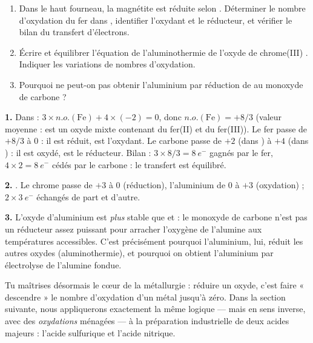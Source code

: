 \documentclass[11pt]{article}
\begin{document}
\begin{exercice}
\begin{enumerate}
\item Dans le haut fourneau, la magnétite est réduite selon . Déterminer le nombre d'oxydation du fer dans , identifier l'oxydant et le réducteur, et vérifier le bilan du transfert d'électrons.
\item Écrire et équilibrer l'équation de l'aluminothermie de l'oxyde de chrome(III) . Indiquer les variations de nombres d'oxydation.
\item Pourquoi ne peut-on pas obtenir l'aluminium par réduction de  au monoxyde de carbone ?
\end{enumerate}
\end{exercice}

\begin{corrige}[Exercice]
\textbf{1.} Dans  : $3 \times n.o.(\text{Fe}) + 4 \times (-2) = 0$, donc $n.o.(\text{Fe}) = +8/3$ (valeur moyenne :  est un oxyde mixte contenant du fer(II) et du fer(III)). Le fer passe de $+8/3$ à $0$ : il est réduit,  est l'oxydant. Le carbone passe de $+2$ (dans ) à $+4$ (dans ) : il est oxydé,  est le réducteur. Bilan : $3 \times 8/3 = 8\ e^-$ gagnés par le fer, $4 \times 2 = 8\ e^-$ cédés par le carbone : le transfert est équilibré.\par
\textbf{2.} . Le chrome passe de $+3$ à $0$ (réduction), l'aluminium de $0$ à $+3$ (oxydation) ; $2 \times 3\ e^-$ échangés de part et d'autre.\par
\textbf{3.} L'oxyde d'aluminium  est \emph{plus} stable que  et  : le monoxyde de carbone n'est pas un réducteur assez puissant pour arracher l'oxygène de l'alumine aux températures accessibles. C'est précisément pourquoi l'aluminium, lui, réduit les autres oxydes (aluminothermie), et pourquoi on obtient l'aluminium par électrolyse de l'alumine fondue.
\end{corrige}

Tu maîtrises désormais le cœur de la métallurgie : réduire un oxyde, c'est faire « descendre » le nombre d'oxydation d'un métal jusqu'à zéro. Dans la section suivante, nous appliquerons exactement la même logique — mais en sens inverse, avec des \emph{oxydations} ménagées — à la préparation industrielle de deux acides majeurs : l'acide sulfurique et l'acide nitrique.
\end{document}
